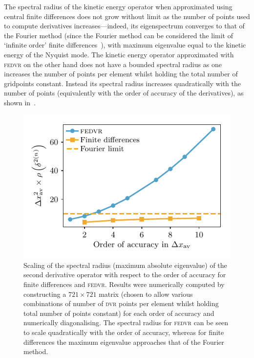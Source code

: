 The spectral radius of the kinetic energy operator when approximated using central finite differences does not grow without limit as the number of points used to compute derivatives increases---indeed, its eigenspectrum converges to that of the Fourier method (since the Fourier method can be considered the limit of `infinite order' finite differences~\cite{fornberg_pseudospectral_1987}), with maximum eigenvalue equal to the kinetic energy of the Nyquist mode. The kinetic energy operator approximated with \textsc{fedvr} on the other hand does not have a bounded spectral radius as one increases the number of points per element whilst holding the total number of gridpoints constant. Instead its spectral radius increases quadratically with the number of points (equivalently with the order of accuracy of the derivatives), as shown in~.

\begin{figure}[t]
    \centerfloat
    \includegraphics{figures/numerics/fedvr_eigenvalue_scaling.pdf}
    \caption{Scaling of the spectral radius (maximum absolute eigenvalue) of the second derivative operator with respect to the order of accuracy for finite differences and \textsc{fedvr}. Results were numerically computed by constructing a $721\times721$ matrix (chosen to allow various combinations of number of \textsc{dvr} points per element whilst holding total number of points constant) for each order of accuracy and numerically diagonalising. The spectral radius for \textsc{fedvr} can be seen to scale quadratically with the order of accuracy, whereas for finite differences the maximum eigenvalue approaches that of the Fourier method.}
    \label{fig:fedvr_eigenvalue_scaling}
\end{figure}


